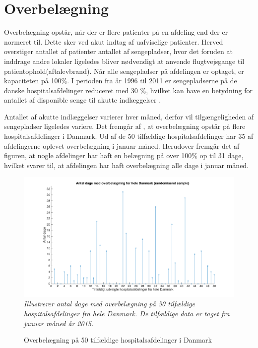 \section{Overbelægning}\label{sec:overbelaegning}

Overbelægning opstår, når der er flere patienter på en afdeling end der er normeret til\cite{Heidmann2014}. Dette sker ved akut indtag af uafviselige patienter. Herved overstiger antallet af patienter antallet af sengepladser, hvor det foruden at inddrage andre lokaler ligeledes bliver nødvendigt at anvende flugtvejsgange til patientophold(aftalevbrand). Når alle sengepladser på afdelingen er optaget, er kapaciteten på 100\%. I perioden fra år 1996 til 2011 er sengepladserne på de danske hospitalsafdelinger reduceret med 30 \%, hvilket kan have en betydning for antallet af disponible senge til akutte indlæggelser \cite{Madsen2014}. 

Antallet af akutte indlæggelser varierer hver måned, derfor vil tilgængeligheden af sengepladser ligeledes variere. Det fremgår af , at overbelægning opstår på flere hospitalsafdelinger i Danmark. Ud af de 50 tilfældige hospitalsafdelinger har 35 af afdelingerne oplevet overbelægning i januar måned. Herudover fremgår det af figuren, at nogle afdelinger har haft en belægning på over 100\% op til 31 dage, hvilket svarer til, at afdelingen har haft overbelægning alle dage i januar måned. 


\begin{figure}[H]
	\flushleft 
	\caption{Overbelægning på 50 tilfældige hospitalsafdelinger i Danmark}
	\centering
	\includegraphics[scale=.8]{figures/overbelaegning_ran}
	\label{ig:overbelaegning_ran}
	\flushleft
	\textit{Illustrerer antal dage med overbelægning på 50 tilfældige hospitalsafdelinger fra hele Danmark. De tilfældige data er taget fra januar måned år 2015. \cite{SDS2015}}
\end{figure}



